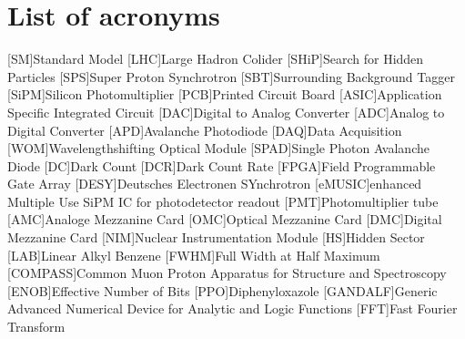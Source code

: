\documentclass[listof=totoc,bibliography=totocnumbered,a4paper,english,12pt,twoside]{report}
\begin{document}
\onehalfspacing





\newpage
\thispagestyle{empty}
\mbox{}\newpage
{}

\thispagestyle{empty}
\mbox{}\newpage
\thispagestyle{empty}


\thispagestyle{empty}
\newpage
\thispagestyle{empty}
\mbox{}\newpage

\setcounter{page}{1}
\tableofcontents

\newpage







\appendix

\chapter{List of acronyms}
\begin{acronym}[SiPM]
    [SM]{Standard Model}
    [LHC]{Large Hadron Colider}
    [SHiP]{Search for Hidden Particles}
    [SPS]{Super Proton Synchrotron}
    [SBT]{Surrounding Background Tagger}
    [SiPM]{Silicon Photomultiplier}
    [PCB]{Printed Circuit Board}
    [ASIC]{Application Specific Integrated Circuit}
    [DAC]{Digital to Analog Converter}
    [ADC]{Analog to Digital Converter}
    [APD]{Avalanche Photodiode}
    [DAQ]{Data Acquisition}
    [WOM]{Wavelengthshifting Optical Module}
    [SPAD]{Single Photon Avalanche Diode}
    [DC]{Dark Count}
    [DCR]{Dark Count Rate}
    [FPGA]{Field Programmable Gate Array}
    [DESY]{Deutsches Electronen SYnchrotron}
    [eMUSIC]{enhanced Multiple Use SiPM IC for photodetector readout}
    [PMT]{Photomultiplier tube}
    [AMC]{Analoge Mezzanine Card}
    [OMC]{Optical Mezzanine Card}
    [DMC]{Digital Mezzanine Card}
    [NIM]{Nuclear Instrumentation Module}
    [HS]{Hidden Sector}
    [LAB]{Linear Alkyl Benzene}
    [FWHM]{Full Width at Half Maximum}
    [COMPASS]{Common Muon Proton Apparatus for Structure and Spectroscopy}
    [ENOB]{Effective Number of Bits}
    [PPO]{Diphenyloxazole}
    [GANDALF]{Generic Advanced Numerical Device for Analytic and Logic Functions}
    [FFT]{Fast Fourier Transform}
\end{acronym}
\end{document}
